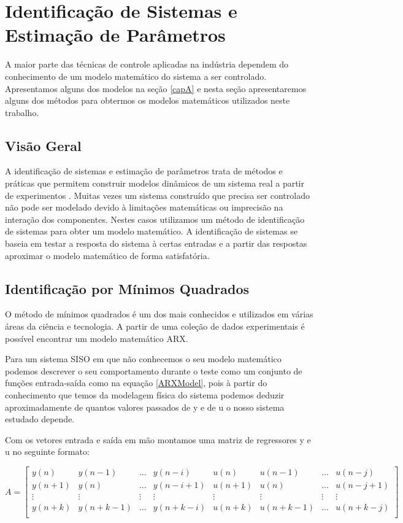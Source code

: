 \section{Identificação de Sistemas e Estimação de Parâmetros}
A maior parte das técnicas de controle aplicadas na indústria dependem do conhecimento de um modelo matemático do sistema a ser controlado. Apresentamos alguns dos modelos na seção \ref{capA} e nesta seção apresentaremos alguns dos métodos para obtermos os modelos matemáticos utilizados neste trabalho.


\subsection{Visão Geral}
A identificação de sistemas e estimação de parâmetros trata de métodos e práticas que permitem construir modelos dinâmicos de um sistema real a partir de experimentos . Muitas vezes um sistema construído que precisa ser controlado não pode ser modelado devido à limitações matemáticas ou imprecisão na interação dos componentes. Nestes casos utilizamos um método de identificação de sistemas para obter um modelo matemático. A identificação de sistemas se baseia em testar a resposta do sistema à certas entradas e a partir das respostas aproximar o modelo matemático de forma satisfatória.


\subsection{Identificação por Mínimos Quadrados}
O método de mínimos quadrados é um dos mais conhecidos e utilizados em várias áreas da ciência e tecnologia. A partir de uma coleção de dados experimentais é possível encontrar um modelo matemático ARX.


Para um sistema SISO em que não conhecemos o seu modelo matemático podemos descrever o seu comportamento durante o teste como um conjunto de funções entrada-saída como na equação \ref{ARXModel}, pois à partir do conhecimento que temos da modelagem física do sistema podemos deduzir aproximadamente de quantos valores passados de y e de u o nosso sistema estudado depende.


Com os vetores entrada e saída em mão montamos uma matriz de regressores y e u no seguinte formato:

\begin{equation}
A=
\begin{bmatrix}
y(n) & y(n-1) & \dots & y(n-i) & u(n) & u(n-1) & \dots & u(n-j)\\
y(n+1) & y(n) & \dots & y(n-i+1) & u(n+1) & u(n) & \dots & u(n-j+1)\\
\vdots & \vdots & \vdots & \vdots & \vdots & \vdots & \vdots  & \vdots\\
y(n+k) & y(n+k-1) & \dots & y(n+k-i) & u(n+k) & u(n+k-1) & \dots & u(n+k-j)\\
\end{bmatrix}
\end{equation}

